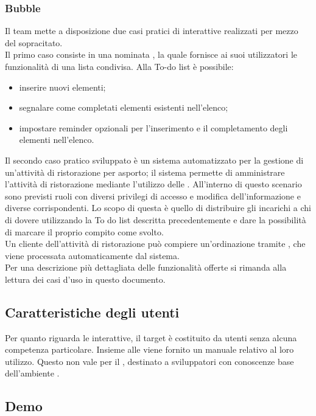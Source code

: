 \subsubsection{Bubble}
Il team \GroupName{} mette a disposizione due casi pratici di  interattive realizzati per mezzo del  sopracitato.\\
Il primo caso consiste in una  nominata , la quale fornisce ai suoi utilizzatori le funzionalità di una lista condivisa. Alla To-do list è possibile:
\begin{itemize}
	\item inserire nuovi elementi;
	\item segnalare come completati elementi esistenti nell'elenco;
	\item impostare reminder opzionali per l'inserimento e il completamento degli elementi nell'elenco.
\end{itemize}
Il secondo caso pratico sviluppato è un sistema automatizzato per la gestione di un'attività di ristorazione per asporto; il sistema permette di amministrare l'attività di ristorazione mediante l'utilizzo delle . All'interno di questo scenario sono previsti ruoli con diversi privilegi di accesso e modifica dell'informazione e diverse  corrispondenti.
Lo scopo di questa  è quello di distribuire gli incarichi a chi di dovere utilizzando la  To do list descritta precedentemente e dare la possibilità di marcare il proprio compito come svolto.\\
Un cliente dell'attività di ristorazione può compiere un'ordinazione tramite , che viene processata automaticamente dal sistema.\\
Per una descrizione più dettagliata delle funzionalità offerte si rimanda alla lettura dei casi d'uso in questo documento.

\subsection{Caratteristiche degli utenti}
Per quanto riguarda le  interattive, il target è costituito da utenti senza alcuna competenza particolare. Insieme alle  viene fornito un manuale relativo al loro utilizzo. Questo non vale per il , destinato a sviluppatori con conoscenze base dell'ambiente .

\subsection{Demo}

